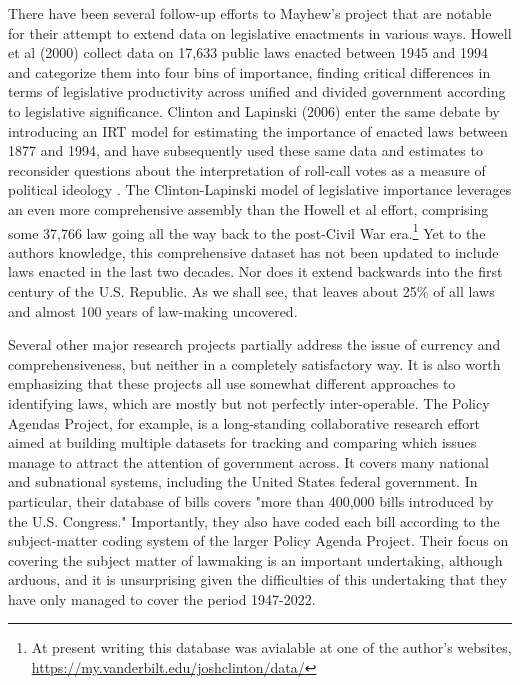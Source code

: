 \documentclass[fleqn,10pt]{wlscirep}
\begin{document}
 There have been several follow-up efforts to Mayhew's project that are notable for their attempt to extend data on legislative enactments in various ways. Howell et al (2000) collect data on 17,633 public laws enacted between 1945 and 1994 and categorize them into four bins of importance, finding critical differences in terms of legislative productivity across unified and divided government according to legislative significance. \cite{Howell2000} Clinton and Lapinski (2006) enter the same debate by introducing an IRT model for estimating the importance of enacted laws between 1877 and 1994,\cite{clinton2006measuring} and have subsequently used these same data and estimates to reconsider questions about the interpretation of roll-call votes as a measure of political ideology \cite{clinton2008laws,lapinski2008,bateman2017}. The Clinton-Lapinski model of legislative importance leverages an even more comprehensive assembly than the Howell et al effort, comprising some 37,766 law going all the way back to the post-Civil War era.\footnote{At present writing this database was avialable at one of the author's websites, \url{https://my.vanderbilt.edu/joshclinton/data/}} Yet to the authors knowledge, this comprehensive dataset has not been updated to include laws enacted in the last two decades. Nor does it extend backwards into the first century of the U.S. Republic. As we shall see, that leaves about 25\% of all laws and almost 100 years of law-making uncovered.

Several other major research projects partially address the issue of currency and comprehensiveness, but neither in a completely satisfactory way. It is also worth emphasizing that these projects all use somewhat different approaches to identifying laws, which are mostly but not perfectly inter-operable. The Policy Agendas Project, for example, is a long-standing collaborative research effort aimed at building multiple datasets for tracking and comparing which issues manage to attract the attention of government across. It covers many national and subnational systems, including the United States federal government. In particular, their database of bills covers "more than 400,000 bills introduced by the U.S. Congress." Importantly, they also have coded each bill according to the subject-matter coding system of the larger Policy Agenda Project. Their focus on covering the subject matter of lawmaking is an important undertaking, although arduous, and it is unsurprising given the difficulties of this undertaking that they have only managed to cover the period 1947-2022. 
\end{document}
